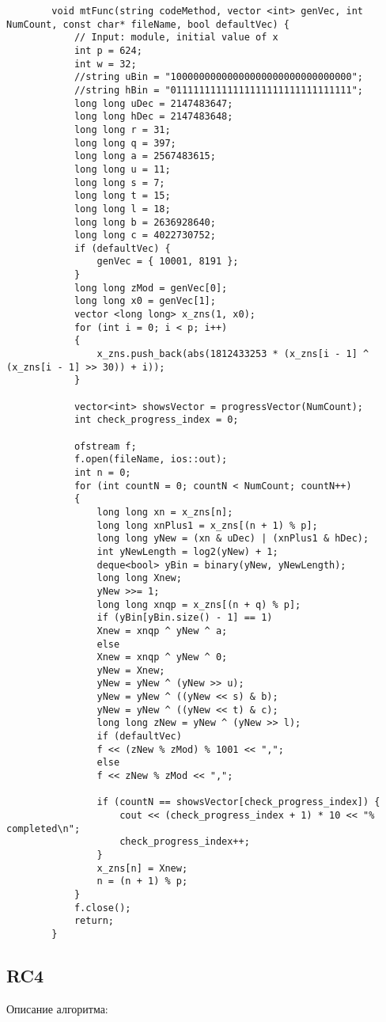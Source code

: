 \documentclass[bachelor, och, coursework]{shiza}
\begin{document}
	\begin{verbatim}
		void mtFunc(string codeMethod, vector <int> genVec, int NumCount, const char* fileName, bool defaultVec) {
			// Input: module, initial value of x
			int p = 624;
			int w = 32;
			//string uBin = "10000000000000000000000000000000";
			//string hBin = "01111111111111111111111111111111";
			long long uDec = 2147483647;
			long long hDec = 2147483648;
			long long r = 31;
			long long q = 397;
			long long a = 2567483615;
			long long u = 11;
			long long s = 7;
			long long t = 15;
			long long l = 18;
			long long b = 2636928640;
			long long c = 4022730752;
			if (defaultVec) {
				genVec = { 10001, 8191 };
			}
			long long zMod = genVec[0];
			long long x0 = genVec[1];
			vector <long long> x_zns(1, x0);
			for (int i = 0; i < p; i++)
			{
				x_zns.push_back(abs(1812433253 * (x_zns[i - 1] ^ (x_zns[i - 1] >> 30)) + i));
			}
			
			vector<int> showsVector = progressVector(NumCount);
			int check_progress_index = 0;
			
			ofstream f;
			f.open(fileName, ios::out);
			int n = 0;
			for (int countN = 0; countN < NumCount; countN++)
			{
				long long xn = x_zns[n];
				long long xnPlus1 = x_zns[(n + 1) % p];
				long long yNew = (xn & uDec) | (xnPlus1 & hDec);
				int yNewLength = log2(yNew) + 1;
				deque<bool> yBin = binary(yNew, yNewLength);
				long long Xnew;
				yNew >>= 1;
				long long xnqp = x_zns[(n + q) % p];
				if (yBin[yBin.size() - 1] == 1)
				Xnew = xnqp ^ yNew ^ a;
				else
				Xnew = xnqp ^ yNew ^ 0;
				yNew = Xnew;
				yNew = yNew ^ (yNew >> u);
				yNew = yNew ^ ((yNew << s) & b);
				yNew = yNew ^ ((yNew << t) & c);
				long long zNew = yNew ^ (yNew >> l);
				if (defaultVec)
				f << (zNew % zMod) % 1001 << ",";
				else
				f << zNew % zMod << ",";
				
				if (countN == showsVector[check_progress_index]) {
					cout << (check_progress_index + 1) * 10 << "% completed\n";
					check_progress_index++;
				}
				x_zns[n] = Xnew;
				n = (n + 1) % p;
			}
			f.close();
			return;
		}
	\end{verbatim}
	
	
	\subsection{RC4}
	
	Описание алгоритма:
	
\end{document}
